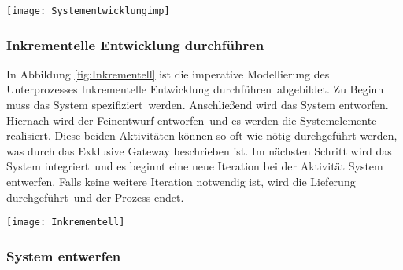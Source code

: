 \begin{sidewaysfigure}[!htbp]
\begin{center}
  \texttt{[image: Systementwicklungimp]} %
  \caption{Systementwicklungsprojekt AG/AN  V-Modell XT - imperativ}
  \label{fig:Systementwicklungimp}
\end{center}
\end{sidewaysfigure}




\subsubsection{Inkrementelle Entwicklung durchführen}
In Abbildung \ref{fig:Inkrementell} ist die imperative Modellierung des Unterprozesses \grqq Inkrementelle Entwicklung durchführen\grqq \ abgebildet. 
Zu Beginn muss das \grqq System spezifiziert\grqq \ werden. Anschließend wird das \grqq System entworfen\grqq.
Hiernach wird der \grqq Feinentwurf entworfen\grqq \ und es werden die \grqq Systemelemente realisiert\grqq. Diese beiden Aktivitäten können so oft wie nötig durchgeführt werden, was durch das Exklusive Gateway beschrieben ist.  
Im nächsten Schritt wird das \grqq System integriert\grqq \ und es beginnt eine neue Iteration bei der Aktivität \grqq System entwerfen\grqq.
Falls keine weitere Iteration notwendig ist, wird die \grqq Lieferung durchgeführt\grqq \ und der Prozess endet. \newline

\begin{sidewaysfigure}[!htbp]
\begin{center}
  \texttt{[image: Inkrementell]} %
  \caption{Unterprozess Inkrementelle Entwicklung durchführen V-Modell XT - imperativ}
  \label{fig:Inkrementell}
\end{center}
\end{sidewaysfigure}



\clearpage


\subsubsection{System entwerfen}

